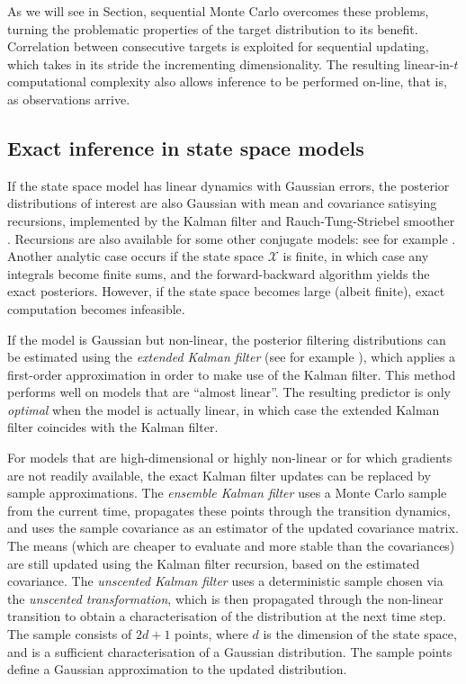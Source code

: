 As we will see in Section, sequential Monte Carlo overcomes these problems, turning the problematic properties of the target distribution to its benefit. Correlation between consecutive targets is exploited for sequential updating, which takes in its stride the incrementing dimensionality. The resulting linear-in-$t$ computational complexity also allows inference to be performed on-line, that is, as observations arrive.




\subsection{Exact inference in state space models \seb{$\checkmark$} }
If the state space model has linear dynamics with Gaussian errors, the posterior distributions of interest are also Gaussian with mean and covariance satisying recursions, implemented by the Kalman filter \parencite{kalman1960} and Rauch-Tung-Striebel smoother \parencite{rauch1965}. Recursions are also available for some other conjugate models: see for example \textcite{vidoni1999}.
Another analytic case occurs if the state space $\mathcal{X}$ is finite, in which case any integrals become finite sums, and the forward-backward algorithm \parencite{baum1970} yields the exact posteriors. However, if the state space becomes large (albeit finite), exact computation becomes infeasible.

If the model is Gaussian but non-linear, the posterior filtering distributions can be estimated using the \emph{extended Kalman filter} (see for example \textcite{jazwinski2007}), which applies a first-order approximation in order to make use of the Kalman filter. This method performs well on models that are ``almost linear''. The resulting predictor is only \emph{optimal} when the model is actually linear, in which case the extended Kalman filter coincides with the Kalman filter.

For models that are high-dimensional or highly non-linear or for which gradients are not readily available, the exact Kalman filter updates can be replaced by sample approximations.
The \emph{ensemble Kalman filter} \parencite{evensen1994} uses a Monte Carlo sample from the current time, propagates these points through the transition dynamics, and uses the sample covariance as an estimator of the updated covariance matrix. The means (which are cheaper to evaluate and more stable than the covariances) are still updated using the Kalman filter recursion, based on the estimated covariance.
The \emph{unscented Kalman filter} \parencite{wan2000} uses a deterministic sample chosen via the \emph{unscented transformation}, which is then propagated through the non-linear transition to obtain a characterisation of the distribution at the next time step. The sample consists of $2d+1$ points, where $d$ is the dimension of the state space, and is a sufficient characterisation of a Gaussian distribution. The sample points define a Gaussian approximation to the updated distribution.

